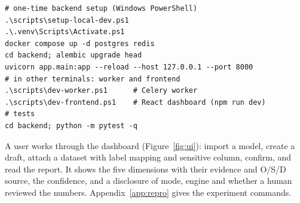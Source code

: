 \begin{lstlisting}
# one-time backend setup (Windows PowerShell)
.\scripts\setup-local-dev.ps1
.\.venv\Scripts\Activate.ps1
docker compose up -d postgres redis
cd backend; alembic upgrade head
uvicorn app.main:app --reload --host 127.0.0.1 --port 8000
# in other terminals: worker and frontend
.\scripts\dev-worker.ps1      # Celery worker
.\scripts\dev-frontend.ps1    # React dashboard (npm run dev)
# tests
cd backend; python -m pytest -q
\end{lstlisting}

A user works through the dashboard (Figure~\ref{fig:ui}): import a model, create a draft, attach a dataset with label mapping and sensitive column, confirm, and read the report. It shows the five dimensions with their evidence and O/S/D source, the confidence, and a disclosure of mode, engine and whether a human reviewed the numbers. Appendix~\ref{app:repro} gives the experiment commands.
